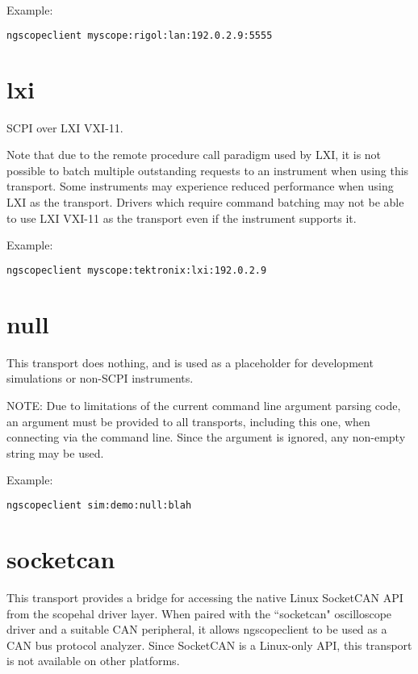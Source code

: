Example:
\begin{lstlisting}[language=sh, numbers=none]
ngscopeclient myscope:rigol:lan:192.0.2.9:5555
\end{lstlisting}

\section{lxi}

SCPI over LXI VXI-11.

Note that due to the remote procedure call paradigm used by LXI, it is not possible to batch multiple outstanding
requests to an instrument when using this transport. Some instruments may experience reduced performance when using LXI
as the transport. Drivers which require command batching may not be able to use LXI VXI-11 as the transport even if the
instrument supports it.

Example:
\begin{lstlisting}[language=sh, numbers=none]
ngscopeclient myscope:tektronix:lxi:192.0.2.9
\end{lstlisting}

\section{null}

This transport does nothing, and is used as a placeholder for development simulations or non-SCPI instruments.

NOTE: Due to limitations of the current command line argument parsing code, an argument must be provided to all
transports, including this one, when connecting via the command line. Since the argument is ignored, any non-empty
string may be used.

Example:
\begin{lstlisting}[language=sh, numbers=none]
ngscopeclient sim:demo:null:blah
\end{lstlisting}

\section{socketcan}

This transport provides a bridge for accessing the native Linux SocketCAN API from the scopehal driver layer. When
paired with the ``socketcan" oscilloscope driver and a suitable CAN peripheral, it allows ngscopeclient to be used as a
CAN bus protocol analyzer. Since SocketCAN is a Linux-only API, this transport is not available on other platforms.

